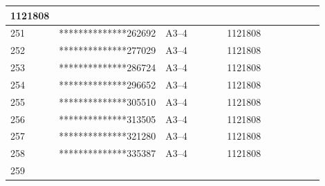 \documentclass[UTF8,10pt,a4paper,fontset=fandol]{ctexart}
\newcommand{\fieldvalue}[1]{#1}
\begin{document}
\begin{center}
\begin{tabular}{|p{0.07\linewidth}|p{0.27\linewidth}|p{0.22\linewidth}|p{0.18\linewidth}|p{0.16\linewidth}|}
\fieldvalue{1121808} & \\ \hline
251 &
\fieldvalue{**************262692} &
\fieldvalue{A3--4} &
\fieldvalue{1121808} & \\ \hline
252 &
\fieldvalue{**************277029} &
\fieldvalue{A3--4} &
\fieldvalue{1121808} & \\ \hline
253 &
\fieldvalue{**************286724} &
\fieldvalue{A3--4} &
\fieldvalue{1121808} & \\ \hline
254 &
\fieldvalue{**************296652} &
\fieldvalue{A3--4} &
\fieldvalue{1121808} & \\ \hline
255 &
\fieldvalue{**************305510} &
\fieldvalue{A3--4} &
\fieldvalue{1121808} & \\ \hline
256 &
\fieldvalue{**************313505} &
\fieldvalue{A3--4} &
\fieldvalue{1121808} & \\ \hline
257 &
\fieldvalue{**************321280} &
\fieldvalue{A3--4} &
\fieldvalue{1121808} & \\ \hline
258 &
\fieldvalue{**************335387} &
\fieldvalue{A3--4} &
\fieldvalue{1121808} & \\ \hline
259 &

\end{tabular}
\end{center}
\end{document}
